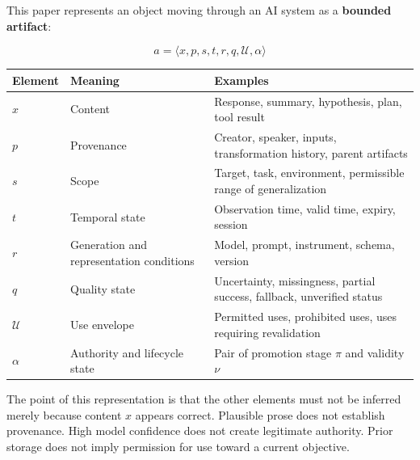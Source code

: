 This paper represents an object moving through an AI system as a \textbf{bounded artifact}:

\[
a = \langle x,p,s,t,r,q,\mathcal U,\alpha \rangle
\]

{\def\LTcaptype{none} %
\begin{longtable}[]{@{}
  >{\raggedright\arraybackslash}p{}
  >{\raggedright\arraybackslash}p{}
  >{\raggedright\arraybackslash}p{}@{}}
\toprule\noalign{}
\begin{minipage}[b]{\linewidth}\raggedright
Element
\end{minipage} & \begin{minipage}[b]{\linewidth}\raggedright
Meaning
\end{minipage} & \begin{minipage}[b]{\linewidth}\raggedright
Examples
\end{minipage} \\
\midrule\noalign{}
\endhead
\bottomrule\noalign{}
\endlastfoot
\(x\) & Content & Response, summary, hypothesis, plan, tool result \\
\(p\) & Provenance & Creator, speaker, inputs, transformation history, parent artifacts \\
\(s\) & Scope & Target, task, environment, permissible range of generalization \\
\(t\) & Temporal state & Observation time, valid time, expiry, session \\
\(r\) & Generation and representation conditions & Model, prompt, instrument, schema, version \\
\(q\) & Quality state & Uncertainty, missingness, partial success, fallback, unverified status \\
\(\mathcal U\) & Use envelope & Permitted uses, prohibited uses, uses requiring revalidation \\
\(\alpha\) & Authority and lifecycle state & Pair of promotion stage \(\pi\) and validity \(\nu\) \\
\end{longtable}
}

The point of this representation is that the other elements must not be inferred merely because content \(x\) appears correct. Plausible prose does not establish provenance. High model confidence does not create legitimate authority. Prior storage does not imply permission for use toward a current objective.

